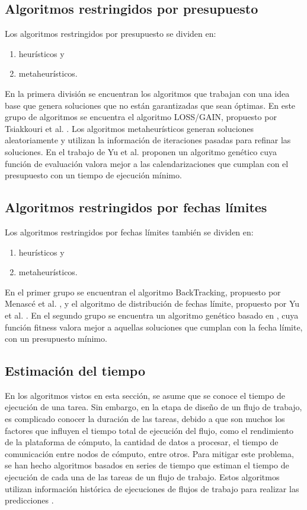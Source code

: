 \subsection{Algoritmos restringidos por presupuesto}

Los algoritmos restringidos por presupuesto se dividen en: 

\begin{enumerate}
\item{heurísticos y}
\item{metaheurísticos.}
\end{enumerate}

En la primera división se encuentran los algoritmos que trabajan con una idea base que genera soluciones que no están garantizadas que sean óptimas. En este grupo de algoritmos se encuentra el algoritmo LOSS/GAIN, propuesto por Tsiakkouri et al. \cite{sakellariou2007scheduling}. Los algoritmos metaheurísticos generan soluciones aleatoriamente y utilizan la información de iteraciones pasadas para refinar las soluciones. En el trabajo de Yu et al. \cite{yu2006scheduling} proponen un algoritmo genético cuya función de evaluación valora mejor a las calendarizaciones que cumplan con el presupuesto con un tiempo de ejecución mínimo.

\subsection{Algoritmos restringidos por fechas límites}

Los algoritmos restringidos por fechas límites también se dividen en:

\begin{enumerate}
\item{heurísticos y}
\item{metaheurísticos.}
\end{enumerate}

En el primer grupo se encuentran el algoritmo BackTracking, propuesto por Menascé et al. \cite{menasce2004framework}, y el algoritmo de distribución de fechas límite, propuesto por Yu et al. \cite{yu2005cost}. En el segundo grupo se encuentra un algoritmo genético basado en \cite{yu2006scheduling}, cuya función fitness valora mejor a aquellas soluciones que cumplan con la fecha límite, con un presupuesto mínimo.

\subsection{Estimación del tiempo}
En los algoritmos vistos en esta sección, se asume que se conoce el tiempo de ejecución de una tarea. Sin embargo, en la etapa de diseño de un flujo de trabajo, es complicado conocer la duración de las tareas, debido a que son muchos los factores que influyen el tiempo total de ejecución del flujo, como el rendimiento de la plataforma de cómputo, la cantidad de datos a procesar, el tiempo de comunicación entre nodos de cómputo, entre otros. Para mitigar este problema, se han hecho algoritmos basados en series de tiempo que estiman el tiempo de ejecución de cada una de las tareas de un flujo de trabajo. Estos algoritmos utilizan información histórica de ejecuciones de flujos de trabajo para realizar las predicciones  \cite{liu2011novel}.
